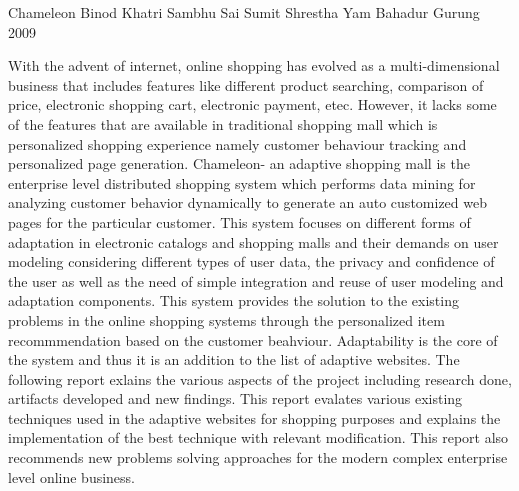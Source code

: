 \begin{conf-abstract}[]
{Chameleon}
{
               Binod Khatri
                Sambhu Sai
              Sumit Shrestha
             Yam Bahadur Gurung
}
{2009}

With the advent of internet, online shopping has evolved as a multi-dimensional business
that includes features like different product searching, comparison of price, electronic
shopping cart, electronic payment, etec. However, it lacks some of the features that are 
available in traditional shopping mall which is personalized shopping experience namely 
customer behaviour tracking and personalized page generation. Chameleon- an adaptive shopping
mall is the enterprise level distributed shopping system which performs data mining for analyzing customer 
behavior dynamically to generate an auto customized web pages for the particular customer. This system focuses
on different forms of adaptation in electronic catalogs and shopping malls and their demands on user modeling
considering different types of user data, the privacy and confidence of the user as well as the need of
simple integration and reuse of user modeling and adaptation components. This system provides the solution 
to the  existing problems in the online shopping systems through the personalized item recommmendation based on
the customer beahviour. Adaptability is the core of the system and thus it is an addition to the list of adaptive 
websites. The following report exlains the various aspects of the project including research done, artifacts developed and 
new findings. This report evalates various existing techniques used in the adaptive websites for shopping
purposes and explains the implementation of the best technique with relevant modification. This report also recommends
new problems solving approaches for the modern complex enterprise level online business.
\end{conf-abstract}

   